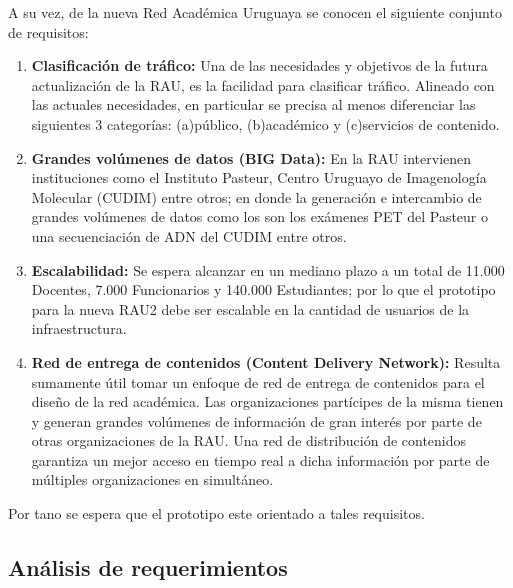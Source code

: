 A su vez, de la nueva Red Académica Uruguaya se conocen el siguiente conjunto de requisitos:


\begin{enumerate}
\item \textbf{Clasificación de tráfico:} Una de las necesidades y objetivos de la futura actualizaci\'on de la RAU, es la facilidad para clasificar tráfico. Alineado con las actuales necesidades, en particular se precisa al menos diferenciar las siguientes 3 categorías: (a)público, (b)académico y (c)servicios de contenido.

\item \textbf{Grandes volúmenes de datos (BIG Data):} En la RAU intervienen instituciones como el Instituto Pasteur, Centro Uruguayo de Imagenología Molecular (CUDIM) entre otros; en donde la generación e intercambio de grandes volúmenes de datos como los son los exámenes PET del Pasteur o una secuenciación de ADN del CUDIM entre otros.

\item \textbf{Escalabilidad:} Se espera alcanzar en un mediano plazo a un total de 11.000 Docentes, 7.000 Funcionarios y 140.000 Estudiantes; por lo que el prototipo para la nueva RAU2 debe ser escalable en la cantidad de usuarios de la infraestructura.

\item \textbf{Red de entrega de contenidos (Content Delivery Network):} Resulta sumamente útil tomar un enfoque de red de entrega de contenidos para el diseño de la red académica. Las organizaciones partícipes de la misma tienen y generan grandes volúmenes de información de gran interés por parte de otras organizaciones de la RAU. Una red de distribución de contenidos garantiza un mejor acceso en tiempo real a dicha información por parte de múltiples organizaciones en simultáneo. 
 
\end{enumerate}

Por tano se espera que el prototipo este orientado a tales requisitos.

\newpage
\subsection[An\'alisis de requerimientos]{An\'alisis de requerimientos}
\label{section1.2.2}

